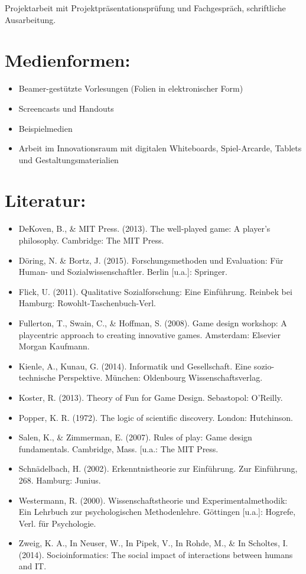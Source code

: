 Projektarbeit mit Projektpräsentationsprüfung und Fachgespräch,
schriftliche Ausarbeitung.

\section*{Medienformen:}\label{medienformen-18}

\begin{itemize}
\tightlist
\item
  Beamer-gestützte Vorlesungen (Folien in elektronischer Form)
\item
  Screencasts und Handouts
\item
  Beispielmedien
\item
  Arbeit im Innovationsraum mit digitalen Whiteboards, Spiel-Arcarde,
  Tablets und Gestaltungsmaterialien
\end{itemize}

\section*{Literatur:}\label{literatur-23}

\begin{itemize}
\tightlist
\item
  DeKoven, B., \& MIT Press. (2013). The well-played game: A player's
  philosophy. Cambridge: The MIT Press.
\item
  Döring, N. \& Bortz, J. (2015). Forschungsmethoden und Evaluation: Für
  Human- und Sozialwissenschaftler. Berlin {[}u.a.{]}: Springer.
\item
  Flick, U. (2011). Qualitative Sozialforschung: Eine Einführung.
  Reinbek bei Hamburg: Rowohlt-Taschenbuch-Verl.
\item
  Fullerton, T., Swain, C., \& Hoffman, S. (2008). Game design workshop:
  A playcentric approach to creating innovative games. Amsterdam:
  Elsevier Morgan Kaufmann.
\item
  Kienle, A., Kunau, G. (2014). Informatik und Gesellschaft. Eine
  sozio-technische Perspektive. München: Oldenbourg Wissenschaftsverlag.
\item
  Koster, R. (2013). Theory of Fun for Game Design. Sebastopol:
  O'Reilly.
\item
  Popper, K. R. (1972). The logic of scientific discovery. London:
  Hutchinson.
\item
  Salen, K., \& Zimmerman, E. (2007). Rules of play: Game design
  fundamentals. Cambridge, Mass. {[}u.a.: The MIT Press.
\item
  Schnädelbach, H. (2002). Erkenntnistheorie zur Einführung. Zur
  Einführung, 268. Hamburg: Junius.
\item
  Westermann, R. (2000). Wissenschaftstheorie und Experimentalmethodik:
  Ein Lehrbuch zur psychologischen Methodenlehre. Göttingen {[}u.a.{]}:
  Hogrefe, Verl. für Psychologie.
\item
  Zweig, K. A., In Neuser, W., In Pipek, V., In Rohde, M., \& In
  Scholtes, I. (2014). Socioinformatics: The social impact of
  interactions between humans and IT.
\end{itemize}

